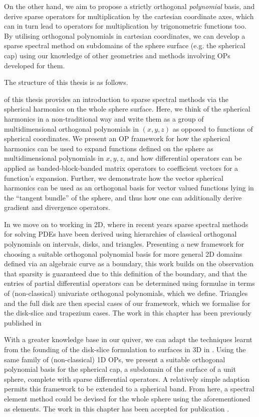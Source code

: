 On the other hand, we aim to propose a strictly orthogonal \textit{polynomial} basis, and derive sparse operators for multiplication by the cartesian coordinate axes, which can in turn lead to operators for multiplication by trigonometric functions too. By utilising orthogonal polynomials in cartesian coordinates, we can develop a sparse spectral method on subdomains of the sphere surface (e.g. the spherical cap) using our knowledge of other geometries and methods involving OPs developed for them.

The structure of this thesis is as follows.

 of this thesis provides an introduction to sparse spectral methods via the spherical harmonics on the whole sphere surface. Here, we think of the spherical harmonics in a non-traditional way and write them as a group of multidimensional orthogonal polynomials in $(x,y,z)$ as opposed to functions of spherical coordinates. We present an OP framework for how the spherical harmonics can be used to expand functions defined on the sphere as multidimensional polynomials in $x, y, z$, and how differential operators can be applied as banded-block-banded matrix operators to coefficient vectors for a function's expansion. Further, we demonstrate how the vector spherical harmonics can be used as an orthogonal basis for vector valued functions lying in the \enquote{tangent bundle} of the sphere, and thus how one can additionally derive gradient and divergence operators.

In  we move on to working in 2D, where in recent years sparse spectral methods for solving PDEs have been derived using hierarchies of classical orthogonal polynomials on intervals, disks, and triangles. Presenting a new framework for choosing a suitable orthogonal polynomial basis for more general 2D domains defined via an algebraic curve as a boundary, this work builds on the observation that sparsity is guaranteed due to this definition of the boundary, and that the entries of partial differential operators can be determined using formulae in terms of (non-classical) univariate orthogonal polynomials, which we define. Triangles and the full disk are then special cases of our framework, which we formalise for the disk-slice and trapezium cases. The work in this chapter has been previously published in \cite{snowball2019sparse}

With a greater knowledge base in our quiver, we can adapt the techniques learnt from the founding of the disk-slice formulation to surfaces in 3D in . Using the same family of (non-classical) 1D OPs, we present a suitable orthogonal polynomial basis for the spherical cap, a subdomain of the surface of a unit sphere, complete with sparse differential operators. A relatively simple adaption permits this framework to be extended to a spherical band. From here, a spectral element method could be devised for the whole sphere using the aforementioned as elements. The work in this chapter has been accepted for publication \cite{snowball2020sparse}.

